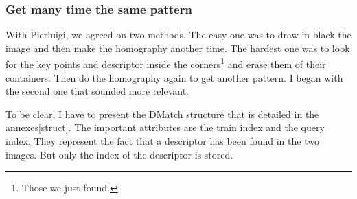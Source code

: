 	\subsubsection[Multiple pattern]{Get many time the same pattern}

	\par With Pierluigi, we agreed on two methods. The easy one was to draw in black the image and then make the homography another time. The hardest one was to look for the key points and descriptor inside the corners\footnote{Those we just found.} and erase them of their containers. Then do the homography again to get another pattern. I began with the second one that sounded more relevant. 
	
	\par To be clear, I have to present the DMatch structure that is detailed in the \hyperlink{structDMatch}{annexes}\ref{struct}. The important attributes are the train index and the query index. They represent the fact that a descriptor has been found in the two images. But only the index of the descriptor is stored.
	
